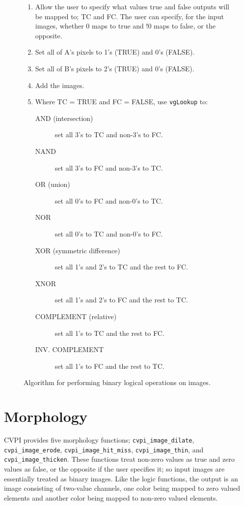 \documentclass[12pt]{report}
\begin{document}
\begin{figure}[H]
\begin{mdframed}[style=default]
\begin{enumerate}
\item Allow the user to specify what values true and false outputs will
be mapped to; TC and FC. The user can specify, for the input
images, whether 0 maps to true and !0 maps to false, or the
opposite.
\item Set all of A's pixels to 1's (TRUE) and 0's (FALSE).
\item Set all of B's pixels to 2's (TRUE) and 0's (FALSE).
\item Add the images.
\item Where TC = TRUE and FC = FALSE, use {\tt vgLookup} to:
\begin{description}
\item[{AND (intersection)}] set all 3's to TC and non-3's to FC.
\item[{NAND}] set all 3's to FC and non-3's to TC.
\item[{OR (union)}] set all 0's to FC and non-0's to TC.
\item[{NOR}] set all 0's to TC and non-0's to FC.
\item[{XOR (symmetric difference)}] set all 1's and 2's to TC and the rest to FC.
\item[{XNOR}] set all 1's and 2's to FC and the rest to TC.
\item[{COMPLEMENT (relative)}] set all 1's to TC and the rest to FC.
\item[{INV. COMPLEMENT}] set all 1's to FC and the rest to TC.
\end{description}
\end{enumerate}
\end{mdframed}
\caption{Algorithm for performing binary logical operations on images.}
\end{figure}

\section{Morphology}
\label{sec-3-13}
CVPI provides five morphology functions; {\tt cvpi\_image\_dilate},
{\tt cvpi\_image\_\-erode}, {\tt cvpi\_image\_\-hit\_miss}, {\tt cvpi\_image\_thin}, and
{\tt cvpi\_image\_thicken}. These functions treat non-zero values as true
and zero values as false, or the opposite if the user specifies
it; so input images are essentially treated as binary images. Like
the logic functions, the output is an image consisting of two-value
channels, one color being mapped to zero valued elements and
another color being mapped to non-zero valued
elements.
\end{document}
